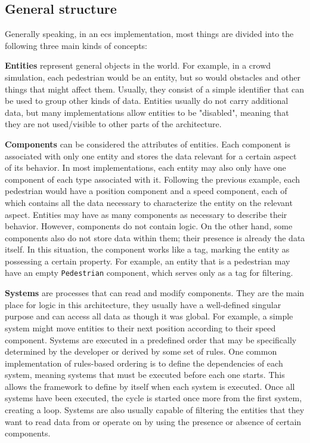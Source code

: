 \documentclass[twoside, 11pt]{article}
\begin{document}
\subsection{General structure}

Generally speaking, in an \gls{ecs} implementation, most things are divided into the following three main kinds of concepts: 

\textbf{Entities} represent general objects in the world. For example, in a crowd simulation, each pedestrian would be an entity, but so would obstacles and other things that might affect them. Usually, they consist of a simple identifier that can be used to group other kinds of data. Entities usually do not carry additional data, but many implementations allow entities to be "disabled", meaning that they are not used/visible to other parts of the architecture.


\textbf{Components} can be considered the attributes of entities. Each component is associated with only one entity and stores the data relevant for a certain aspect of its behavior. In most implementations, each entity may also only have one component of each type associated with it. Following the previous example, each pedestrian would have a position component and a speed component, each of which contains all the data necessary to characterize the entity on the relevant aspect. Entities may have as many components as necessary to describe their behavior. However, components do not contain logic. On the other hand, some components also do not store data within them; their presence is already the data itself. In this situation, the component works like a tag, marking the entity as possessing a certain property. For example, an entity that is a pedestrian may have an empty \verb|Pedestrian| component, which serves only as a tag for filtering.

\textbf{Systems} are processes that can read and modify components. They are the main place for logic in this architecture, they usually have a well-defined singular purpose and can access all data as though it was global. For example, a simple system might move entities to their next position according to their speed component. Systems are executed in a predefined order that may be specifically determined by the developer or derived by some set of rules. One common implementation of rules-based ordering is to define the dependencies of each system, meaning systems that must be executed before each one starts. This allows the framework to define by itself when each system is executed. Once all systems have been executed, the cycle is started once more from the first system, creating a loop. Systems are also usually capable of filtering the entities that they want to read data from or operate on by using the presence or absence of certain components.
\end{document}

